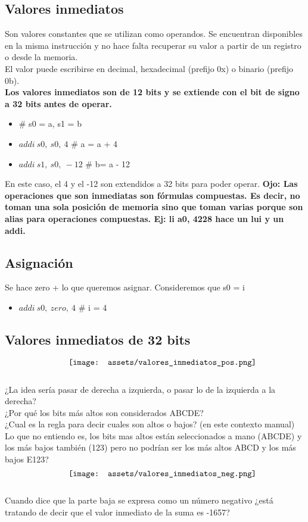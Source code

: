 \documentclass[10pt,a4paper]{article}
\begin{document}
\subsection*{Valores inmediatos}
Son valores constantes que se utilizan como operandos. Se encuentran disponibles en la misma instrucción y no hace falta recuperar su valor a partir de un registro o desde la memoria. \\
El valor puede escribirse en decimal, hexadecimal (prefijo 0x) o binario (prefijo 0b). \\
\textbf{Los valores inmediatos son de 12 bits y se extiende con el bit de signo a 32 bits antes de operar.}
\begin{itemize}
    \item \# s0 = a, s1 = b
    \item \(addi \ s0,\ s0,\ 4\) \# a = a + 4
    \item \(addi \ s1,\ s0, \ -12\) \# b= a - 12
\end{itemize}
En este caso, el 4 y el -12 son extendidos a 32 bits para poder operar. 
\textbf{Ojo: Las operaciones que son inmediatas son fórmulas compuestas. Es decir, no toman una sola posición de memoria sino que toman varias porque son alias para operaciones compuestas. Ej: li a0, 4228 hace un lui y un addi.}
\subsection*{Asignación}
Se hace zero + lo que queremos asignar. Consideremos que s0 = i
\begin{itemize}
    \item \(addi \ s0,\ zero,\ 4\) \# i = 4
\end{itemize}
\subsection*{Valores inmediatos de 32 bits}
\[\begin{minipage}[b]{0.6\textwidth}
    \texttt{[image: assets/valores\_inmediatos\_pos.png]}
    \label{fig:valores_pos}
\end{minipage}\]
¿La idea sería pasar de derecha a izquierda, o pasar lo de la izquierda a la derecha? \\
¿Por qué los bits más altos son considerados ABCDE? \\
¿Cual es la regla para decir cuales son altos o bajos? (en este contexto manual)
Lo que no entiendo es, los bits mas altos están seleccionados a mano (ABCDE) y los más bajos también (123) pero no podrían ser los más altos ABCD y los más bajos E123?
\[\begin{minipage}[b]{0.6\textwidth}
    \texttt{[image: assets/valores\_inmediatos\_neg.png]}
    \label{fig:valores_neg}
\end{minipage}\]
Cuando dice que la parte baja se expresa como un número negativo ¿está tratando de decir que el valor inmediato de la suma es -1657?
\end{document}
